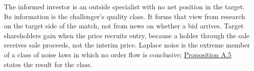 
The informed investor is an outside specialist with no net position in
the target. Its information is the challenger's quality class. It forms
that view from research on the target side of the match, not from news
on whether a bid arrives. Target shareholders gain when the price
recruits entry, because a holder through the sale receives sale
proceeds, not the interim price. Laplace noise is the extreme member
of a class of noise laws in which no order flow is conclusive;
\hyperref[result-proposition-a-5]{Proposition A.5} states the result
for the class.
